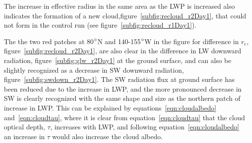 The increase in effective radius in the same area as the LWP is increased also indicates the formation of a new cloud,figure~\ref{subfig:recloud_r2Day1}, that could not form in the control run (see figure~\ref{subfig:recloud_r1Day1}).


The the two red patches at 80$\degree$N and 140-155$\degree$W in the figure for difference in $r_e$, figure~\ref{subfig:recloud_r2Day1}, are also clear in the difference in LW downward radiation, figure~\ref{subfig:glw_r2Day1} at the ground surface, and can also be slightly recognized as a decrease in SW downward radiation, figure~\ref{subfig:swdown_r2Day1}. The SW radiation flux at ground surface has been reduced due to the increase in LWP, and the more pronounced decrease in SW is clearly recognized with the same shape and size as the northern patch of increase in LWP. This can be explained by equations~\ref{eqn:cloudalbedo} and~\ref{eqn:cloudtau}, where it is clear from equation~\ref{eqn:cloudtau} that the cloud optical depth, $\tau$, increases with LWP, and following equation~\ref{eqn:cloudalbedo} an increase in $\tau$ would also increase the cloud albedo.

